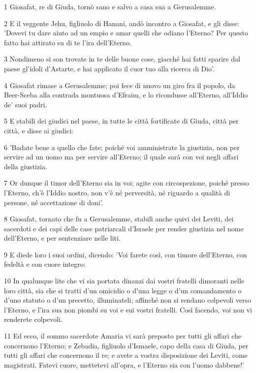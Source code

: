 \par 1 Giosafat, re di Giuda, tornò sano e salvo a casa sua a Gerusalemme.
\par 2 E il veggente Jehu, figliuolo di Hanani, andò incontro a Giosafat, e gli disse: 'Dovevi tu dare aiuto ad un empio e amar quelli che odiano l'Eterno? Per questo fatto hai attirato su di te l'ira dell'Eterno.
\par 3 Nondimeno si son trovate in te delle buone cose, giacché hai fatti sparire dal paese gl'idoli d'Astarte, e hai applicato il cuor tuo alla ricerca di Dio'.
\par 4 Giosafat rimase a Gerusalemme; poi fece di nuovo un giro fra il popolo, da Beer-Sceba alla contrada montuosa d'Efraim, e lo ricondusse all'Eterno, all'Iddio de' suoi padri.
\par 5 E stabilì dei giudici nel paese, in tutte le città fortificate di Giuda, città per città, e disse ai giudici:
\par 6 'Badate bene a quello che fate; poiché voi amministrate la giustizia, non per servire ad un uomo ma per servire all'Eterno; il quale sarà con voi negli affari della giustizia.
\par 7 Or dunque il timor dell'Eterno sia in voi; agite con circospezione, poiché presso l'Eterno, ch'è l'Iddio nostro, non v'è né perversità, né riguardo a qualità di persone, né accettazione di doni'.
\par 8 Giosafat, tornato che fu a Gerusalemme, stabilì anche quivi dei Leviti, dei sacerdoti e dei capi delle case patriarcali d'Israele per render giustizia nel nome dell'Eterno, e per sentenziare nelle liti.
\par 9 E diede loro i suoi ordini, dicendo: 'Voi farete così, con timore dell'Eterno, con fedeltà e con cuore integro:
\par 10 In qualunque lite che vi sia portata dinanzi dai vostri fratelli dimoranti nelle loro città, sia che si tratti d'un omicidio o d'una legge o d'un comandamento o d'uno statuto o d'un precetto, illuminateli, affinché non si rendano colpevoli verso l'Eterno, e l'ira sua non piombi su voi e sui vostri fratelli. Così facendo, voi non vi renderete colpevoli.
\par 11 Ed ecco, il sommo sacerdote Amaria vi sarà preposto per tutti gli affari che concernono l'Eterno; e Zebadia, figliuolo d'Ismaele, capo della casa di Giuda, per tutti gli affari che concernono il re; e avete a vostra disposizione dei Leviti, come magistrati. Fatevi cuore, mettetevi all'opra, e l'Eterno sia con l'uomo dabbene!'

